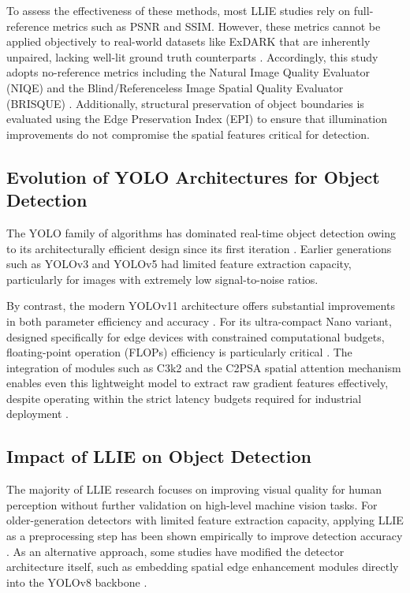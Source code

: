 \documentclass[conference]{IEEEtran}
\begin{document}
To assess the effectiveness of these methods, most LLIE studies rely on full-reference metrics such as PSNR and SSIM. However, these metrics cannot be applied objectively to real-world datasets like ExDARK that are inherently unpaired, lacking well-lit ground truth counterparts \cite{loh2019exdark,liu2021benchmark}. Accordingly, this study adopts no-reference metrics including the Natural Image Quality Evaluator (NIQE) \cite{mittal2013niqe} and the Blind/Referenceless Image Spatial Quality Evaluator (BRISQUE) \cite{mittal2012brisque}. Additionally, structural preservation of object boundaries is evaluated using the Edge Preservation Index (EPI) to ensure that illumination improvements do not compromise the spatial features critical for detection.

\subsection{Evolution of YOLO Architectures for Object Detection}
The YOLO family of algorithms has dominated real-time object detection owing to its architecturally efficient design since its first iteration \cite{redmon2016yolo,terven2023yoloreview}. Earlier generations such as YOLOv3 and YOLOv5 had limited feature extraction capacity, particularly for images with extremely low signal-to-noise ratios.

By contrast, the modern YOLOv11 architecture offers substantial improvements in both parameter efficiency and accuracy \cite{khanam2024yolov11}. For its ultra-compact Nano variant, designed specifically for edge devices with constrained computational budgets, floating-point operation (FLOPs) efficiency is particularly critical \cite{akavaram2025flops,dobrzycki2025freezing}. The integration of modules such as C3k2 and the C2PSA spatial attention mechanism enables even this lightweight model to extract raw gradient features effectively, despite operating within the strict latency budgets required for industrial deployment \cite{liang2022edgeyolo}.

\subsection{Impact of LLIE on Object Detection}
The majority of LLIE research focuses on improving visual quality for human perception without further validation on high-level machine vision tasks. For older-generation detectors with limited feature extraction capacity, applying LLIE as a preprocessing step has been shown empirically to improve detection accuracy \cite{wang2023yolov5lowlight,shovo2024lowlight}. As an alternative approach, some studies have modified the detector architecture itself, such as embedding spatial edge enhancement modules directly into the YOLOv8 backbone \cite{gong2025multiscale}.
\end{document}
